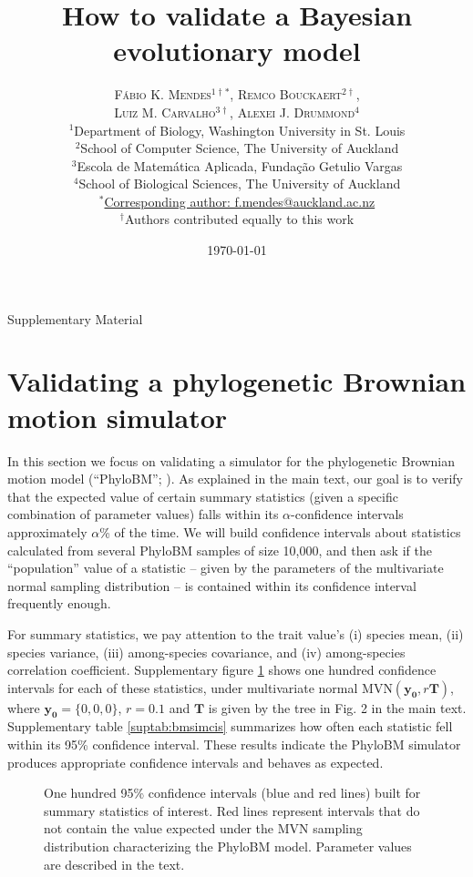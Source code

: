 \documentclass[oneside]{article}
\title{How to validate a Bayesian evolutionary model} %
\author{\textsc{F\'{a}bio K. Mendes$^{1\dagger*}$}, \textsc{Remco Bouckaert$^{2\dagger}$},\\
\textsc{Luiz M. Carvalho$^{3\dagger}$}, \textsc{Alexei J. Drummond$^{4}$} \\
\small $^1$Department of Biology, Washington University in St. Louis\\
\small $^2$School of Computer Science, The University of Auckland\\
\small $^3$Escola de Matem\'{a}tica Aplicada, Fundaç\~{a}o Getulio Vargas\\
\small $^4$School of Biological Sciences, The University of Auckland\\
\small
\href{mailto:f.mendes@auckland.ac.nz}{$^*$Corresponding author: f.mendes@auckland.ac.nz}\\
{\small $^\dagger$Authors contributed equally to this work}
}
\date{\today} %
\begin{document}
\maketitle

\begin{center}
    \Large Supplementary Material
\end{center}

\newpage

\section{Validating a phylogenetic Brownian motion simulator}

In this section we focus on validating a simulator for the phylogenetic Brownian motion model (``PhyloBM''; \citealp{fel73}).
As explained in the main text, our goal is to verify that the expected value of certain summary statistics (given a specific combination of parameter values) falls within its $\alpha$-confidence intervals approximately $\alpha$\% of the time.
We will build confidence intervals about statistics calculated from several PhyloBM samples of size 10,000, and then ask if the ``population'' value of  a statistic -- given by the parameters of the multivariate normal sampling distribution -- is contained within its confidence interval frequently enough.

For summary statistics, we pay attention to the trait value's (i) species mean, (ii) species variance, (iii) among-species covariance, and (iv) among-species correlation coefficient.
Supplementary figure \ref{supfig:bmsimcis} shows one hundred confidence intervals for each of these statistics, under multivariate normal $\text{MVN}(\boldsymbol{y_0},r\boldsymbol{T})$, where $\boldsymbol{y_0}=\{0,0,0\}$, $r=0.1$ and $\boldsymbol{T}$ is given by the tree in Fig. 2 in the main text.
Supplementary table \ref{suptab:bmsimcis} summarizes how often each statistic fell within its 95\% confidence interval.
These results indicate the PhyloBM simulator produces appropriate confidence intervals and behaves as expected.

\begin{figure}
  \centering
  
  \caption{One hundred 95\% confidence intervals (blue and red lines) built for summary statistics of interest.
    Red lines represent intervals that do not contain the value expected under the MVN sampling distribution characterizing the PhyloBM model.
    Parameter values are described in the text.}
  \label{supfig:bmsimcis}
\end{figure}
\end{document}
